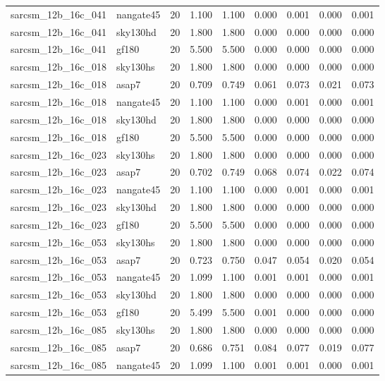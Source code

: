 \begin{tabular}{llrrrrrrr}
sarcsm\_12b\_16c\_041 & nangate45 & 20 & 1.100 & 1.100 & 0.000 & 0.001 & 0.000 & 0.001 \\
sarcsm\_12b\_16c\_041 & sky130hd & 20 & 1.800 & 1.800 & 0.000 & 0.000 & 0.000 & 0.000 \\
sarcsm\_12b\_16c\_041 & gf180 & 20 & 5.500 & 5.500 & 0.000 & 0.000 & 0.000 & 0.000 \\
sarcsm\_12b\_16c\_018 & sky130hs & 20 & 1.800 & 1.800 & 0.000 & 0.000 & 0.000 & 0.000 \\
sarcsm\_12b\_16c\_018 & asap7 & 20 & 0.709 & 0.749 & 0.061 & 0.073 & 0.021 & 0.073 \\
sarcsm\_12b\_16c\_018 & nangate45 & 20 & 1.100 & 1.100 & 0.000 & 0.001 & 0.000 & 0.001 \\
sarcsm\_12b\_16c\_018 & sky130hd & 20 & 1.800 & 1.800 & 0.000 & 0.000 & 0.000 & 0.000 \\
sarcsm\_12b\_16c\_018 & gf180 & 20 & 5.500 & 5.500 & 0.000 & 0.000 & 0.000 & 0.000 \\
sarcsm\_12b\_16c\_023 & sky130hs & 20 & 1.800 & 1.800 & 0.000 & 0.000 & 0.000 & 0.000 \\
sarcsm\_12b\_16c\_023 & asap7 & 20 & 0.702 & 0.749 & 0.068 & 0.074 & 0.022 & 0.074 \\
sarcsm\_12b\_16c\_023 & nangate45 & 20 & 1.100 & 1.100 & 0.000 & 0.001 & 0.000 & 0.001 \\
sarcsm\_12b\_16c\_023 & sky130hd & 20 & 1.800 & 1.800 & 0.000 & 0.000 & 0.000 & 0.000 \\
sarcsm\_12b\_16c\_023 & gf180 & 20 & 5.500 & 5.500 & 0.000 & 0.000 & 0.000 & 0.000 \\
sarcsm\_12b\_16c\_053 & sky130hs & 20 & 1.800 & 1.800 & 0.000 & 0.000 & 0.000 & 0.000 \\
sarcsm\_12b\_16c\_053 & asap7 & 20 & 0.723 & 0.750 & 0.047 & 0.054 & 0.020 & 0.054 \\
sarcsm\_12b\_16c\_053 & nangate45 & 20 & 1.099 & 1.100 & 0.001 & 0.001 & 0.000 & 0.001 \\
sarcsm\_12b\_16c\_053 & sky130hd & 20 & 1.800 & 1.800 & 0.000 & 0.000 & 0.000 & 0.000 \\
sarcsm\_12b\_16c\_053 & gf180 & 20 & 5.499 & 5.500 & 0.001 & 0.000 & 0.000 & 0.000 \\
sarcsm\_12b\_16c\_085 & sky130hs & 20 & 1.800 & 1.800 & 0.000 & 0.000 & 0.000 & 0.000 \\
sarcsm\_12b\_16c\_085 & asap7 & 20 & 0.686 & 0.751 & 0.084 & 0.077 & 0.019 & 0.077 \\
sarcsm\_12b\_16c\_085 & nangate45 & 20 & 1.099 & 1.100 & 0.001 & 0.001 & 0.000 & 0.001 \\

\end{tabular}
